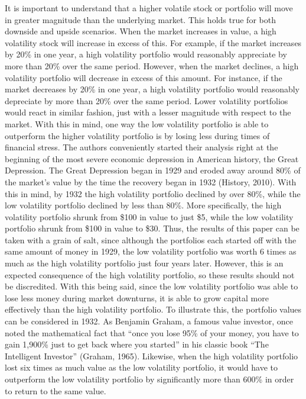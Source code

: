 \documentclass[12pt,twoside]{reedthesis}
\theoremstyle{definition}
\theoremstyle{definition}
\theoremstyle{definition}
\theoremstyle{remark}
\begin{document}
It is important to understand that a higher volatile stock or portfolio
will move in greater magnitude than the underlying market. This holds
true for both downside and upside scenarios. When the market increases
in value, a high volatility stock will increase in excess of this. For
example, if the market increases by 20\% in one year, a high volatility
portfolio would reasonably appreciate by more than 20\% over the same
period. However, when the market declines, a high volatility portfolio
will decrease in excess of this amount. For instance, if the market
decreases by 20\% in one year, a high volatility portfolio would
reasonably depreciate by more than 20\% over the same period. Lower
volatility portfolios would react in similar fashion, just with a lesser
magnitude with respect to the market. With this in mind, one way the low
volatility portfolio is able to outperform the higher volatility
portfolio is by losing less during times of financial stress. The
authors conveniently started their analysis right at the beginning of
the most severe economic depression in American history, the Great
Depression. The Great Depression began in 1929 and eroded away around
80\% of the market's value by the time the recovery began in 1932
(History, 2010). With this in mind, by 1932 the high volatility
portfolio declined by over 80\%, while the low volatility portfolio
declined by less than 80\%. More specifically, the high volatility
portfolio shrunk from \$100 in value to just \$5, while the low
volatility portfolio shrunk from \$100 in value to \$30. Thus, the
results of this paper can be taken with a grain of salt, since although
the portfolios each started off with the same amount of money in 1929,
the low volatility portfolio was worth 6 times as much as the high
volatility portfolio just four years later. However, this is an expected
consequence of the high volatility portfolio, so these results should
not be discredited. With this being said, since the low volatility
portfolio was able to lose less money during market downturns, it is
able to grow capital more effectively than the high volatility
portfolio. To illustrate this, the portfolio values can be considered in
1932. As Benjamin Graham, a famous value investor, once noted the
mathematical fact that ``once you lose 95\% of your money, you have to
gain 1,900\% just to get back where you started'' in his classic book
``The Intelligent Investor'' (Graham, 1965). Likewise, when the high
volatility portfolio lost six times as much value as the low volatility
portfolio, it would have to outperform the low volatility portfolio by
significantly more than 600\% in order to return to the same value.
\end{document}
